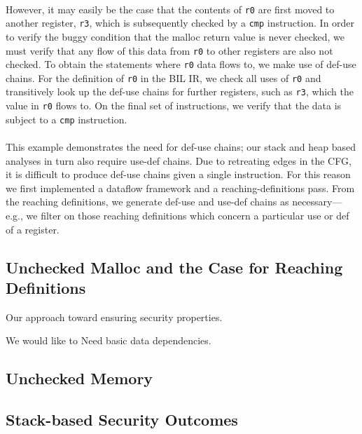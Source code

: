 \documentclass[letterpaper,11pt]{article}
\begin{document}
\paragraph{}
However, it may easily be the case that the contents of \texttt{r0} are first
moved to another register, \texttt{r3}, which is subsequently checked by a
\texttt{cmp} instruction. In order to verify the buggy condition that the malloc
return value is never checked, we must verify that any flow of this data from
\texttt{r0} to other registers are also not checked. To obtain the statements
where \texttt{r0} data flows to, we make use of def-use chains. For the
definition of \texttt{r0} in the BIL IR, we check all uses of \texttt{r0} and
transitively look up the def-use chains for further registers, such as
\texttt{r3}, which the value in \texttt{r0} flows to. On the final set of
instructions, we verify that the data is subject to a \texttt{cmp} instruction.

\paragraph{}
This example demonstrates the need for def-use chains; our stack and heap based
analyses in turn also require use-def chains. Due to retreating edges in the
CFG, it is difficult to produce def-use chains given a single instruction. For
this reason we first implemented a dataflow framework and a
reaching-definitions pass. From the reaching definitions, we generate def-use
and use-def chains as necessary---e.g., we filter on those reaching definitions
which concern a particular use or def of a register.


\subsection{Unchecked Malloc and the Case for Reaching Definitions}


Our approach toward ensuring security properties.



We would like to 
Need basic data dependencies.


\subsection{Unchecked Memory}

\subsection{Stack-based Security Outcomes}
\end{document}
